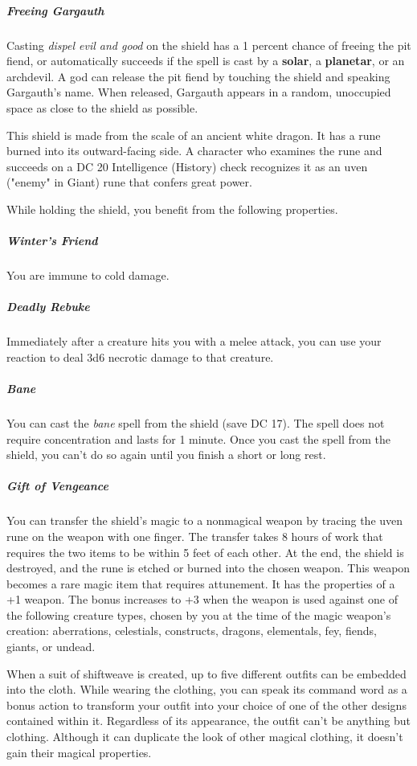 \documentclass[10pt,a4paper,twoside,bg=print,twocolumn,openany,nodeprecatedcode]{dndbook}
\begin{document}
\subparagraph{Freeing Gargauth}
Casting \textit{dispel evil and good} on the shield has a 1 percent chance of freeing the pit fiend, or automatically succeeds if the spell is cast by a \textbf{solar}, a \textbf{planetar}, or an archdevil. A god can release the pit fiend by touching the shield and speaking Gargauth's name. When released, Gargauth appears in a random, unoccupied space as close to the shield as possible.

This shield is made from the scale of an ancient white dragon. It has a rune burned into its outward-facing side. A character who examines the rune and succeeds on a DC 20 Intelligence (History) check recognizes it as an uven ("enemy" in Giant) rune that confers great power.

While holding the shield, you benefit from the following properties.

\subparagraph{Winter's Friend}
You are immune to cold damage.

\subparagraph{Deadly Rebuke}
Immediately after a creature hits you with a melee attack, you can use your reaction to deal 3d6 necrotic damage to that creature.

\subparagraph{Bane}
You can cast the \textit{bane} spell from the shield (save DC 17). The spell does not require concentration and lasts for 1 minute. Once you cast the spell from the shield, you can't do so again until you finish a short or long rest.

\subparagraph{Gift of Vengeance}
You can transfer the shield's magic to a nonmagical weapon by tracing the uven rune on the weapon with one finger. The transfer takes 8 hours of work that requires the two items to be within 5 feet of each other. At the end, the shield is destroyed, and the rune is etched or burned into the chosen weapon. This weapon becomes a rare magic item that requires attunement. It has the properties of a +1 weapon. The bonus increases to +3 when the weapon is used against one of the following creature types, chosen by you at the time of the magic weapon's creation: aberrations, celestials, constructs, dragons, elementals, fey, fiends, giants, or undead.

When a suit of shiftweave is created, up to five different outfits can be embedded into the cloth. While wearing the clothing, you can speak its command word as a bonus action to transform your outfit into your choice of one of the other designs contained within it. Regardless of its appearance, the outfit can't be anything but clothing. Although it can duplicate the look of other magical clothing, it doesn't gain their magical properties.
\end{document}
